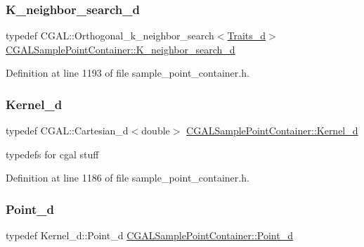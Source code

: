 \subsubsection{\texorpdfstring{K\+\_\+neighbor\+\_\+search\+\_\+d}{K\_neighbor\_search\_d}}
{\footnotesize\ttfamily typedef C\+G\+A\+L\+::\+Orthogonal\+\_\+k\+\_\+neighbor\+\_\+search$<$\hyperlink{classCGALSamplePointContainer_abf3c9b2e8768b34dc1700c1f0d4ea342}{Traits\+\_\+d}$>$ \hyperlink{classCGALSamplePointContainer_a381241085bd45dcba4709de640071982}{C\+G\+A\+L\+Sample\+Point\+Container\+::\+K\+\_\+neighbor\+\_\+search\+\_\+d}\hspace{0.3cm}{\ttfamily [private]}}



Definition at line 1193 of file sample\+\_\+point\+\_\+container.\+h.

\mbox{\label{classCGALSamplePointContainer_aa62fc873f6ad941cd31996baf64e669a}} 
\subsubsection{\texorpdfstring{Kernel\+\_\+d}{Kernel\_d}}
{\footnotesize\ttfamily typedef C\+G\+A\+L\+::\+Cartesian\+\_\+d$<$double$>$ \hyperlink{classCGALSamplePointContainer_aa62fc873f6ad941cd31996baf64e669a}{C\+G\+A\+L\+Sample\+Point\+Container\+::\+Kernel\+\_\+d}\hspace{0.3cm}{\ttfamily [private]}}



typedefs for cgal stuff 



Definition at line 1186 of file sample\+\_\+point\+\_\+container.\+h.

\mbox{\label{classCGALSamplePointContainer_a5cb9506ad72c5a21b91e626d5d8604ed}} 
\subsubsection{\texorpdfstring{Point\+\_\+d}{Point\_d}}
{\footnotesize\ttfamily typedef Kernel\+\_\+d\+::\+Point\+\_\+d \hyperlink{classCGALSamplePointContainer_a5cb9506ad72c5a21b91e626d5d8604ed}{C\+G\+A\+L\+Sample\+Point\+Container\+::\+Point\+\_\+d}\hspace{0.3cm}{\ttfamily [private]}}




